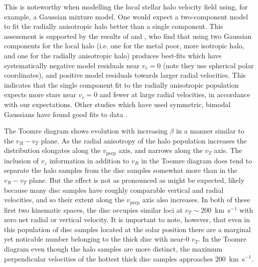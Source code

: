 This is noteworthy when modelling the local stellar halo velocity field using, for example, a Gaussian mixture model. One would expect a two-component model to fit the radially anisotropic halo better than a single component. This assessment is supported by the results of \citet{belokurov18} and \citet{fattahi19}, who find that using two Gaussian components for the local halo (i.e. one for the metal poor, more isotropic halo, and one for the radially anisotropic halo) produces best-fits which have systematically negative model residuals near $v_{r}=0$ (note they use spherical polar coordinates), and positive model residuals towards larger radial velocities. This indicates that the single component fit to the radially anisotropic population expects more stars near $v_{r}=0$ and fewer at large radial velocities, in accordance with our expectations. Other studies which have used symmetric, bimodal Gaussians have found good fits to data \citep{lancaster19,necib19}.

The Toomre diagram shows evolution with increasing $\beta$ in a manner similar to the $v_{R}-v_{T}$ plane. As the radial anisotropy of the halo population increases the distribution elongates along the $v_\mathrm{perp}$ axis, and narrows along the $v_{T}$ axis. The inclusion of $v_{z}$ information in addition to $v_{R}$ in the Toomre diagram does tend to separate the halo samples from the disc samples somewhat more than in the $v_{R}-v_{T}$ plane. But the effect is not as pronounced as might be expected, likely because many disc samples have roughly comparable vertical and radial velocities, and so their extent along the $v_\mathrm{perp}$ axis also increases. In both of these first two kinematic spaces, the disc occupies similar loci at $v_{T} \sim 200$~km~s$^{-1}$ with zero net radial or vertical velocity. It is important to note, however, that even in this population of disc samples located at the solar position there are a marginal yet noticable number belonging to the thick disc with near-0 $v_{T}$. In the Toomre diagram even though the halo samples are more distinct, the maximum perpendicular velocities of the hottest thick disc samples approaches 200~km~s$^{-1}$. 

